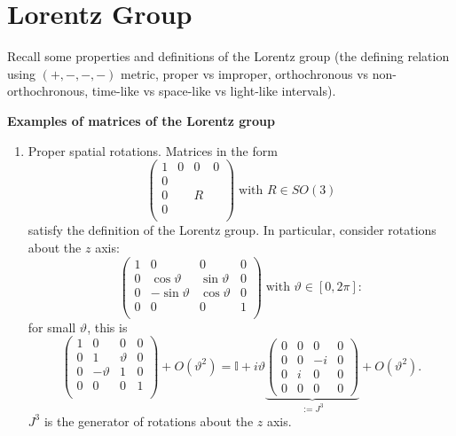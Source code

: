 
\section{Lorentz Group}
Recall some properties and definitions of the Lorentz group
(the defining relation using $\mathbf{(+,-,-,-)}$ metric, proper vs improper,
orthochronous vs non-orthochronous, time-like vs space-like vs light-like 
intervals).

\textbf{Examples of matrices of the Lorentz group}\\
\begin{enumerate}
\item Proper spatial rotations.
    Matrices in the form
        \[
            \begin{pmatrix}
                1&0&0&0\\
                0&&&\\
                0&&R&\\
                0&&&\\
            \end{pmatrix}\;\text{with }R\in SO(3)
        \]
        satisfy the definition of the Lorentz group. In particular, consider
        rotations about the $z$ axis:
        \[
            \begin{pmatrix}
                1&0&0&0\\
                0&\cos\vartheta&\sin\vartheta&0\\
                0&-\sin\vartheta&\cos\vartheta&0\\
                0&0&0&1\\
            \end{pmatrix}\;\text{with }\vartheta\in\left[0,2\pi\right]:
        \]
        for small $\vartheta$, this is
        \[
            \begin{pmatrix}
                1&0&0&0\\
                0&1&\vartheta&0\\
                0&-\vartheta&1&0\\
                0&0&0&1\\
            \end{pmatrix}+ O(\vartheta^2)= 
            \mathbb{I}+i\vartheta\underbrace{\begin{pmatrix}
                0&0&0&0\\
                0&0&-i&0\\
                0&i&0&0\\
                0&0&0&0
        \end{pmatrix}}_{:=J^3}+O(\vartheta^2).
        \]
    $J^3$ is the generator of rotations about the $z$ axis.


\end{enumerate}

